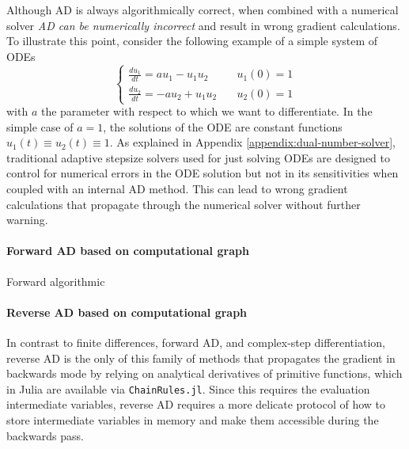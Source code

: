 Although AD is always algorithmically correct, when combined with a numerical solver \textit{AD can be numerically incorrect} and result in wrong gradient calculations. 
To illustrate this point, consider the following example of a simple system of ODEs
\begin{equation}
\begin{cases}
 \frac{du_1}{dt} = a u_1 - u_1 u_2 & \quad u_1(0) = 1  \\ 
 \frac{du_2}{dt} = - a u_2 + u_1 u_2 & \quad u_2(0) = 1
\end{cases}
\end{equation}
with $a$ the parameter with respect to which we want to differentiate. 
In the simple case of $a=1$, the solutions of the ODE are constant functions $u_1(t) \equiv u_2(t) \equiv 1$. 
As explained in Appendix \ref{appendix:dual-number-solver}, traditional adaptive stepsize solvers used for just solving ODEs are designed to control for numerical errors in the ODE solution but not in its sensitivities when coupled with an internal AD method. 
This can lead to wrong gradient calculations that propagate through the numerical solver without further warning. 

\paragraph{Forward AD based on computational graph}

Forward algorithmic 

\paragraph{Reverse AD based on computational graph}
\label{sec:software-reverse-AD}

In contrast to finite differences, forward AD, and complex-step differentiation, reverse AD is the only of this family of methods that propagates the gradient in backwards mode by relying on analytical derivatives of primitive functions, which in Julia are available via \texttt{ChainRules.jl}.
Since this requires the evaluation intermediate variables, reverse AD requires a more delicate protocol of how to store intermediate variables in memory and make them accessible during the backwards pass. 

